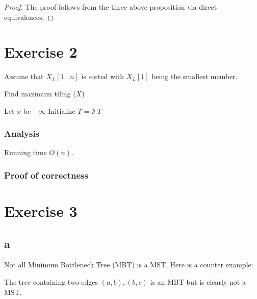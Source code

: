 \documentclass[a4paper,10pt,twoside]{article}
\DeclareMathOperator*{\argmax}{arg\,max}
\newtheorem{proof}{Proof}
\begin{document}
\begin{proof}
	The proof follows from the three above proposition via direct equivalences.
\end{proof}



\section*{Exercise 2}

Assume that $X_L[1...n]$ is sorted with $X_L[1]$ being the smallest member.

\begin{algorithm}[h]
\caption{Find maximum tiling ($X$)}
	Let $x$ be $-\infty$ \;
	Initialize $T = \emptyset$\;
	\Return $T$\;
\end{algorithm}

\subsubsection*{Analysis}
Running time $O(n)$.
\subsubsection*{Proof of correctness}
\section*{Exercise 3}

\subsection*{a}
Not all Minimum Bottleneck Tree (MBT) is a MST. Here is a counter example:

\begin{figure}[h]
	\centering
{}
	\label{fig:figure1}
\end{figure}
The tree containing two edges $(a, b), (b, c)$ is an MBT but is clearly
not a MST.
\end{document}
